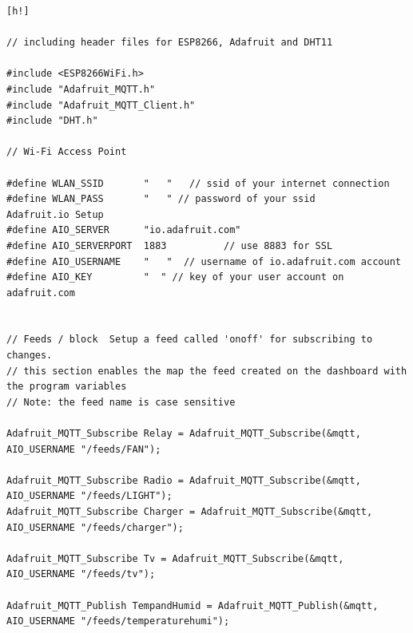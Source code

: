 \documentclass[12pt,a4paper]{article}
\begin{document}
\begin{flushleft}
\begin{lstlisting}[h!]

// including header files for ESP8266, Adafruit and DHT11

#include <ESP8266WiFi.h>
#include "Adafruit_MQTT.h"
#include "Adafruit_MQTT_Client.h"
#include "DHT.h"

// Wi-Fi Access Point

#define WLAN_SSID       "   "   // ssid of your internet connection
#define WLAN_PASS       "   " // password of your ssid
Adafruit.io Setup
#define AIO_SERVER      "io.adafruit.com"
#define AIO_SERVERPORT  1883          // use 8883 for SSL
#define AIO_USERNAME    "   "  // username of io.adafruit.com account
#define AIO_KEY         "  " // key of your user account on adafruit.com


// Feeds / block  Setup a feed called 'onoff' for subscribing to changes.
// this section enables the map the feed created on the dashboard with the program variables
// Note: the feed name is case sensitive 

Adafruit_MQTT_Subscribe Relay = Adafruit_MQTT_Subscribe(&mqtt, AIO_USERNAME "/feeds/FAN");

Adafruit_MQTT_Subscribe Radio = Adafruit_MQTT_Subscribe(&mqtt, AIO_USERNAME "/feeds/LIGHT");
Adafruit_MQTT_Subscribe Charger = Adafruit_MQTT_Subscribe(&mqtt, AIO_USERNAME "/feeds/charger");

Adafruit_MQTT_Subscribe Tv = Adafruit_MQTT_Subscribe(&mqtt, AIO_USERNAME "/feeds/tv");

Adafruit_MQTT_Publish TempandHumid = Adafruit_MQTT_Publish(&mqtt, AIO_USERNAME "/feeds/temperaturehumi");

\end{lstlisting}


\end{flushleft}
\end{document}
